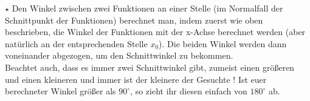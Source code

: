		\(\star\) Den Winkel zwischen zwei Funktionen an einer Stelle (im Normalfall
		der Schnittpunkt der Funktionen) berechnet man, indem zuerst wie oben
		beschrieben, die Winkel der Funktionen mit der x-Achse berechnet werden (aber
		natürlich an der entsprechenden Stelle \(x_0\)). Die beiden Winkel werden dann
		voneinander abgezogen, um den Schnittwinkel zu bekommen.\\
		Beachtet auch, dass es immer zwei Schnittwinkel gibt, zumeist einen größeren
		und einen kleineren und immer ist  der kleinere der Gesuchte ! Ist euer
		berechneter Winkel größer als \(90^\circ\), so zieht ihr diesen einfach von
		\(180^\circ\) ab.
		
		
